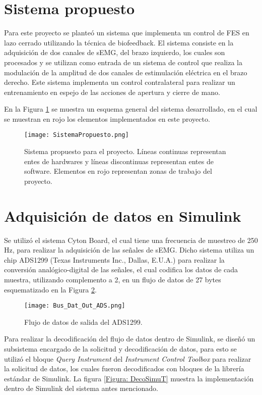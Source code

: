 \section{Sistema propuesto}
Para este proyecto se planteó un sistema que implementa un control de FES en lazo cerrado utilizando la técnica de biofeedback. El sistema consiste en la adquisición de dos canales de sEMG, del brazo izquierdo, los cuales son procesados y se utilizan como entrada de un sistema de control que realiza la modulación de la amplitud de dos canales de estimulación eléctrica en el brazo derecho. Este sistema implementa un control contralateral para realizar un entrenamiento en espejo de las acciones de apertura y cierre de mano.

En la Figura \ref{Figura: SistProp} se muestra un esquema general del sistema desarrollado, en el cual se muestran en rojo los elementos implementados en este proyecto.

\begin{figure}[htbp]
\centering
	\texttt{[image: SistemaPropuesto.png]}
	\caption[Sistema propuesto para el proyecto]{Sistema propuesto para el proyecto. Líneas continuas representan entes de hardwares y líneas discontinuas representan entes de software. Elementos en rojo representan zonas de trabajo del proyecto.}
	\label{Figura: SistProp}
\end{figure}


\section{Adquisición de datos en Simulink} \label{Sec: Adquisicion}
Se utilizó el sistema Cyton Board, el cual tiene una frecuencia de muestreo de 250 Hz, para realizar la adquisición de las señales de sEMG. Dicho sistema utiliza un chip ADS1299 (Texas Instruments Inc., Dallas, E.U.A.) para realizar la conversión analógico-digital de las señales, el cual codifica los datos de cada muestra, utilizando complemento a 2, en un flujo de datos de 27 bytes esquematizado en la Figura \ref{Figura: BusOut}.

\begin{figure}[htbp]
\centering
	\texttt{[image: Bus\_Dat\_Out\_ADS.png]}
	\caption{Flujo de datos de salida del ADS1299.}
	\label{Figura: BusOut}
\end{figure}

Para realizar la decodificación del flujo de datos dentro de Simulink, se diseñó un subsistema encargado de la solicitud y decodificación de datos, para esto se utilizó el bloque \emph{Query Instrument} del \emph{Instrument Control Toolbox} para realizar la solicitud de datos, los cuales fueron decodificados con bloques de la librería estándar de Simulink. La figura \ref{Figura: DecoSimuT} muestra la implementación dentro de Simulink del sistema antes mencionado.

